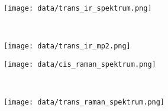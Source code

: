 \documentclass[12pt]{article}
\begin{document}
\begin{onehalfspace}
\begin{figure}[!hptb]
    \centering
    \begin{subfigure}[b]{0.4\textwidth}
        \texttt{[image: data/trans\_ir\_spektrum.png]}
    \end{subfigure}
    ~ %
    \begin{subfigure}[b]{0.4\textwidth}
        \texttt{[image: data/trans\_ir\_mp2.png]}
    \end{subfigure}
\end{figure}


\begin{figure}[!hptb]
    \centering
    \begin{subfigure}[b]{0.4\textwidth}
        \texttt{[image: data/cis\_raman\_spektrum.png]}
    \end{subfigure}
    ~ %
    \begin{subfigure}[b]{0.4\textwidth}
        \texttt{[image: data/trans\_raman\_spektrum.png]}
    \end{subfigure}
\end{figure}

\end{onehalfspace}
\end{document}
